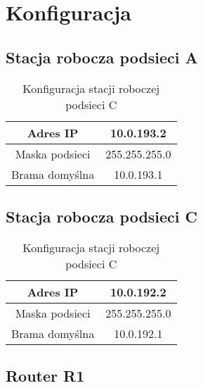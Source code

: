 \documentclass[wide,a4paper,titlepage,12pt] {article}
\begin{document}
  \section{Konfiguracja}

  \subsection{Stacja robocza podsieci A}
\begin{table}[H]
  \begin{center}
    \begin{tabular}{|c|c|}
      \hline
      Adres IP & 10.0.193.2 \\
      \hline
      Maska podsieci & 255.255.255.0 \\
      \hline
      Brama domyślna & 10.0.193.1 \\
      \hline
    \end{tabular}
  \end{center}
  \caption{Konfiguracja stacji roboczej podsieci C}
\end{table}

  \subsection{Stacja robocza podsieci C}
\begin{table}[H]
  \begin{center}
    \begin{tabular}{|c|c|}
      \hline
      Adres IP & 10.0.192.2 \\
      \hline
      Maska podsieci & 255.255.255.0 \\
      \hline
      Brama domyślna & 10.0.192.1 \\
      \hline
    \end{tabular}
  \end{center}
  \caption{Konfiguracja stacji roboczej podsieci C}
\end{table}

  \subsection{Router R1}
\end{document}
